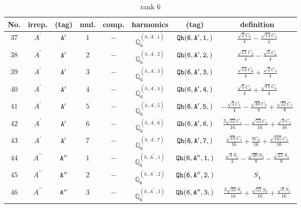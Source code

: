 \documentclass[fleqn,8pt]{jsarticle}
\begin{document}
\begin{table}[ht!]
\begin{center}
\caption{rank 6}
\renewcommand{\arraystretch}{1.3}
\begin{tabular}{cccccccc} \hline \hline
No. & irrep. & (tag) & mul. & comp. & harmonics & (tag) & definition \\ \hline
$ 37 $ & $ A^{\prime} $ & $ {\tt A'} $ & $ 1 $ & $ - $ & $ \mathbb{Q}_{6}^{(h,A^{\prime},1)} $ & $ {\tt Qh(6,A',1,)} $ & $ \frac{\sqrt{2} C_{0}}{4} - \frac{\sqrt{14} C_{4}}{4} $ \\
$ 38 $ & $ A^{\prime} $ & $ {\tt A'} $ & $ 2 $ & $ - $ & $ \mathbb{Q}_{6}^{(h,A^{\prime},2)} $ & $ {\tt Qh(6,A',2,)} $ & $ \frac{\sqrt{11} C_{2}}{4} - \frac{\sqrt{5} C_{6}}{4} $ \\
$ 39 $ & $ A^{\prime} $ & $ {\tt A'} $ & $ 3 $ & $ - $ & $ \mathbb{Q}_{6}^{(h,A^{\prime},3)} $ & $ {\tt Qh(6,A',3,)} $ & $ \frac{\sqrt{14} C_{0}}{4} + \frac{\sqrt{2} C_{4}}{4} $ \\
$ 40 $ & $ A^{\prime} $ & $ {\tt A'} $ & $ 4 $ & $ - $ & $ \mathbb{Q}_{6}^{(h,A^{\prime},4)} $ & $ {\tt Qh(6,A',4,)} $ & $ \frac{\sqrt{5} C_{2}}{4} + \frac{\sqrt{11} C_{6}}{4} $ \\
$ 41 $ & $ A^{\prime} $ & $ {\tt A'} $ & $ 5 $ & $ - $ & $ \mathbb{Q}_{6}^{(h,A^{\prime},5)} $ & $ {\tt Qh(6,A',5,)} $ & $ - \frac{\sqrt{3} C_{1}}{4} - \frac{\sqrt{30} C_{3}}{8} + \frac{\sqrt{22} C_{5}}{8} $ \\
$ 42 $ & $ A^{\prime} $ & $ {\tt A'} $ & $ 6 $ & $ - $ & $ \mathbb{Q}_{6}^{(h,A^{\prime},6)} $ & $ {\tt Qh(6,A',6,)} $ & $ \frac{3 \sqrt{22} C_{1}}{16} - \frac{\sqrt{55} C_{3}}{16} + \frac{\sqrt{3} C_{5}}{16} $ \\
$ 43 $ & $ A^{\prime} $ & $ {\tt A'} $ & $ 7 $ & $ - $ & $ \mathbb{Q}_{6}^{(h,A^{\prime},7)} $ & $ {\tt Qh(6,A',7,)} $ & $ \frac{\sqrt{10} C_{1}}{16} + \frac{9 C_{3}}{16} + \frac{\sqrt{165} C_{5}}{16} $ \\
$ 44 $ & $ A^{\prime\prime} $ & $ {\tt A''} $ & $ 1 $ & $ - $ & $ \mathbb{Q}_{6}^{(h,A^{\prime\prime},1)} $ & $ {\tt Qh(6,A'',1,)} $ & $ \frac{\sqrt{3} S_{1}}{4} - \frac{\sqrt{30} S_{3}}{8} - \frac{\sqrt{22} S_{5}}{8} $ \\
$ 45 $ & $ A^{\prime\prime} $ & $ {\tt A''} $ & $ 2 $ & $ - $ & $ \mathbb{Q}_{6}^{(h,A^{\prime\prime},2)} $ & $ {\tt Qh(6,A'',2,)} $ & $ S_{4} $ \\
$ 46 $ & $ A^{\prime\prime} $ & $ {\tt A''} $ & $ 3 $ & $ - $ & $ \mathbb{Q}_{6}^{(h,A^{\prime\prime},3)} $ & $ {\tt Qh(6,A'',3,)} $ & $ \frac{3 \sqrt{22} S_{1}}{16} + \frac{\sqrt{55} S_{3}}{16} + \frac{\sqrt{3} S_{5}}{16} $ \\

\end{tabular}
\end{center}
\end{table}
\end{document}
